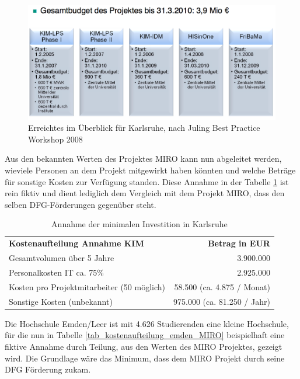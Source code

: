 \begin{figure}[h!]
	\centering
	\includegraphics[width=\textwidth]
	{kapitel/gruppe4_2/bilder/uberblick_projekt_KIM}
	\caption{Erreichtes im Überblick für Karlsruhe, nach Juling Best Practice Workshop 2008}
	\label{fig_uberblick_projekt_KIM}
\end{figure}

Aus den bekannten Werten des Projektes MIRO kann nun abgeleitet werden, wieviele Personen an dem Projekt mitgewirkt haben könnten und welche Beträge für sonstige Kosten zur Verfügung standen. Diese Annahme in der Tabelle \ref{tab_minimale_investition_karlsruhe} ist rein fiktiv und dient lediglich dem Vergleich mit dem Projekt MIRO, dass den selben DFG-Förderungen gegenüber steht.


\begin{table}[h!]
	\begin{tabularx}{\textwidth}{l|r}
		\hline
		\textbf{Kostenaufteilung Annahme KIM} & \textbf{Betrag in EUR}\\
		Gesamtvolumen über 5 Jahre & 3.900.000\\
		Personalkosten IT ca. 75\% & 2.925.000\\
		Kosten pro Projektmitarbeiter (50 möglich) & 58.500 (ca. 4.875 / Monat)\\ 
		Sonstige Kosten (unbekannt) & 975.000 (ca. 81.250 / Jahr)\\
		\hline
	\end{tabularx}
	\caption{Annahme der minimalen Investition in Karlsruhe}
	\label{tab_minimale_investition_karlsruhe}
\end{table}

Die Hochschule Emden/Leer ist mit 4.626 Studierenden eine kleine Hochschule, für die nun in Tabelle \ref{tab_kostenaufteilung_emden_MIRO} beispielhaft eine fiktive Annahme durch Teilung, aus den Werten des MIRO Projektes, gezeigt wird. Die Grundlage wäre das Minimum, dass dem MIRO Projekt durch seine DFG Förderung zukam.

